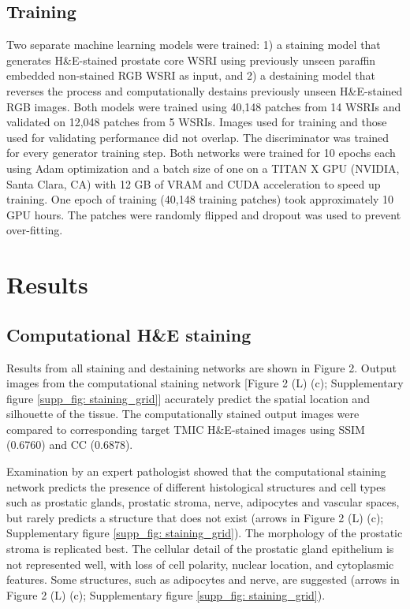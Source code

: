 \documentclass[10pt, conference, compsocconf]{IEEEtran}
\begin{document}
\subsection{Training}
Two separate machine learning models were trained: 1) a staining model that generates H\&E-stained prostate core WSRI using previously unseen paraffin embedded non-stained RGB WSRI as input, and 2) a destaining model that reverses the process and computationally destains previously unseen H\&E-stained RGB images. Both models were trained using 40,148 patches from 14 WSRIs and validated on 12,048 patches from 5 WSRIs. Images used for training and those used for validating performance did not overlap. The discriminator was trained for every generator training step. Both networks were trained for 10 epochs each using Adam optimization and a batch size of one on a TITAN X GPU (NVIDIA, Santa Clara, CA) with 12 GB of VRAM and CUDA acceleration to speed up training. One epoch of training (40,148 training patches) took approximately 10 GPU hours. The patches were randomly flipped and dropout was used to prevent over-fitting.


\section{Results}

\subsection{Computational H\&E staining}
Results from all staining and destaining networks are shown in Figure 2. Output images from the computational staining network [Figure 2 (L) (c); Supplementary figure \ref{supp_fig: staining_grid}] accurately predict the spatial location and silhouette of the tissue. The computationally stained output images were compared to corresponding target TMIC H\&E-stained images using SSIM (0.6760) and CC (0.6878).


Examination by an expert pathologist showed that the computational staining network predicts the presence of different histological structures and cell types such as prostatic glands, prostatic stroma, nerve, adipocytes and vascular spaces, but rarely predicts a structure that does not exist (arrows in Figure 2 (L) (c); Supplementary figure \ref{supp_fig: staining_grid}). The morphology of the prostatic stroma is replicated best. The cellular detail of the prostatic gland epithelium is not represented well, with loss of cell polarity, nuclear location, and cytoplasmic features. Some structures, such as adipocytes and nerve, are suggested (arrows in Figure 2 (L) (c); Supplementary figure \ref{supp_fig: staining_grid}).
\end{document}
